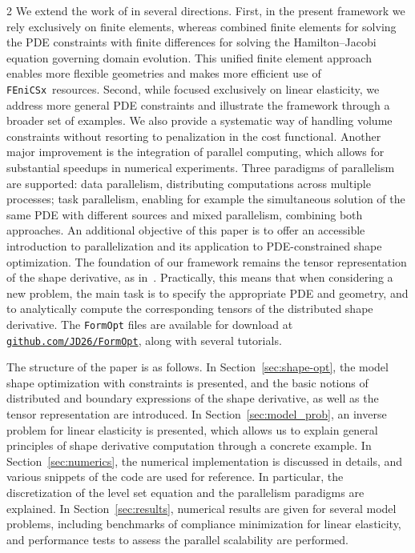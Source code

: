 \documentclass[a4paper, oneside]{article}
\newcommand{\fopt}{\texttt{FormOpt} }
\newcommand{\fx}{\texttt{FEniCSx}}
\begin{document}
\begin{multicols}{2}
We extend the work of \cite{MR3843884} in several directions. 
First, in the present framework we rely exclusively on finite elements, whereas \cite{MR3843884} combined finite elements for solving the PDE constraints with finite differences for solving the Hamilton–Jacobi equation governing domain evolution. This unified finite element approach enables more flexible geometries and makes more efficient use of \fx\ resources.
Second, while \cite{MR3843884} focused exclusively on linear elasticity, we address more general PDE constraints and illustrate the framework through a broader set of examples. 
We also provide a systematic way of handling volume constraints without resorting to penalization in the cost functional.
Another major improvement is the integration of parallel computing, which allows for substantial speedups in numerical experiments. 
Three paradigms of parallelism are supported: data parallelism, distributing computations across multiple processes; task parallelism, enabling for example the simultaneous solution of the same PDE with different sources and mixed parallelism, combining both approaches.
An additional objective of this paper is to offer an accessible introduction to parallelization and its application to PDE-constrained shape optimization.
The foundation of our framework remains the tensor representation of the shape derivative, as in~\cite{MR3843884}. Practically, this means that when considering a new problem, the main task is to specify the appropriate PDE and geometry, and to analytically compute the corresponding tensors of the distributed shape derivative.
The \fopt files are available for download at 
\href{https://github.com/JD26/FormOpt}{\texttt{github.com/JD26/FormOpt}}, 
along with several tutorials.



The structure of the paper is as follows. 
In Section~\ref{sec:shape-opt}, the model shape optimization with constraints is presented, and the basic notions of distributed and boundary expressions of the shape derivative, as well as the  tensor representation
are introduced. 
In Section~\ref{sec:model_prob}, an inverse problem for linear elasticity is presented, which allows us to explain general principles of shape derivative computation through a concrete example.
In Section~\ref{sec:numerics}, the numerical implementation is discussed in details, and various snippets of the code are used for reference. In particular, the discretization of the level set equation and the parallelism paradigms are explained.
In Section~\ref{sec:results}, numerical results are given for several model problems, including benchmarks of compliance minimization for linear elasticity, and performance tests to assess the parallel scalability are performed.



\end{multicols}
\end{document}
